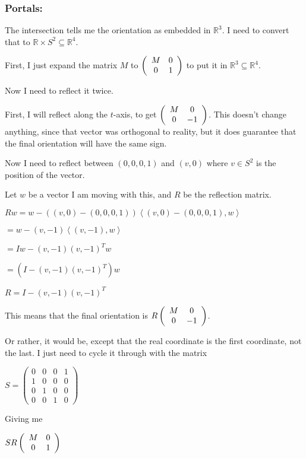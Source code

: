 \bigskip

\subsubsection{Portals:}

The intersection tells me the orientation as embedded in $\mathbb{R}^3$. I need to convert that to $\mathbb{R} \times S^2 \subseteq \mathbb{R}^4$.

First, I just expand the matrix $M$ to $\left(\begin{array}{ccc} M & 0 \\0 & 1 \end{array} \right)$ to put it in $\mathbb{R}^3 \subseteq \mathbb{R}^4$.

Now I need to reflect it twice.

First, I will reflect along the $t$-axis, to get $\left(\begin{array}{ccc} M & 0 \\0 & -1 \end{array} \right)$. This doesn't change anything, since that vector was orthogonal to reality, but it does guarantee that the final orientation will have the same sign.

Now I need to reflect between $(0,0,0,1)$ and $(v,0)$ where $v \in S^2$ is the position of the vector.

Let $w$ be a vector I am moving with this, and $R$ be the reflection matrix.

$Rw = w - ((v,0)-(0,0,0,1))\left<(v,0)-(0,0,0,1),w\right>$

$= w - (v,-1)\left<(v,-1),w\right>$

$= Iw - (v,-1)(v,-1)^Tw$

$= (I - (v,-1)(v,-1)^T)w$

$R = I - (v,-1)(v,-1)^T$

This means that the final orientation is $R\left(\begin{array}{ccc} M & 0 \\0 & -1 \end{array} \right)$.

Or rather, it would be, except that the real coordinate is the first coordinate, not the last. I just need to cycle it through with the matrix

$S = \left(\begin{array}{cccc}
		0 & 0 & 0 & 1 \\
		1 & 0 & 0 & 0 \\
		0 & 1 & 0 & 0 \\
		0 & 0 & 1 & 0
	\end{array} \right)$

Giving me

$SR\left(\begin{array}{ccc} M & 0 \\0 & 1 \end{array} \right)$

